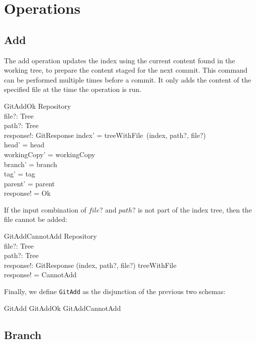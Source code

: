 \section{Operations}

\subsection{Add}

The add operation updates the index using the current content found in the
working tree, to prepare the content staged for the next commit. This command
can be performed multiple times before a commit. It only adds the content of the
specified file at the time the operation is run.

\begin{schema}{GitAddOk}
  \Delta Repository \\
  file?: Tree \\
  path?: Tree \\
  response!: GitResponse
\where
  index' = treeWithFile~(index, path?, file?) \\
  head' = head \\
  workingCopy' = workingCopy \\
  branch' = branch \\
  tag' = tag \\
  parent' = parent \\
  response! = Ok
\end{schema}

If the input combination of $file?$ and $path?$ is not part of the index tree,
then the file cannot be added:

\begin{schema}{GitAddCannotAdd}
  \Xi Repository \\
  file?: Tree \\
  path?: Tree \\
  response!: GitResponse
\where
  (index, path?, file?) \notin \dom treeWithFile \\
  response! = CannotAdd
\end{schema}

Finally, we define \texttt{GitAdd} as the disjunction of the previous two
schemas:

\begin{zed}
  GitAdd  GitAddOk \lor GitAddCannotAdd
\end{zed}

\subsection{Branch}

